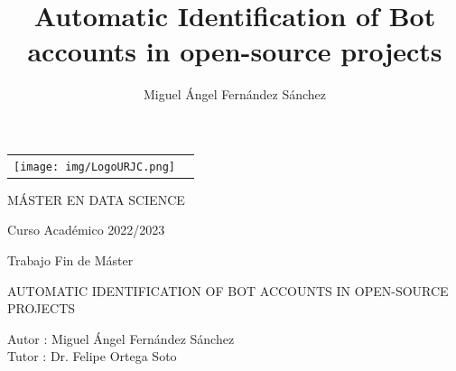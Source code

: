 \documentclass[a4paper, 12pt]{book}
\title{Automatic Identification of Bot accounts in open-source projects}
\author{Miguel Ángel Fernández Sánchez}
\begin{document}
 


\begin{titlepage}
\begin{center}
\begin{tabular}[c]{c c}
\texttt{[image: img/LogoURJC.png]}
\\
\end{tabular}

\vspace{3cm}

\Large 
MÁSTER EN DATA SCIENCE

\vspace{0.4cm}

\large
Curso Académico 2022/2023

\vspace{0.8cm}

Trabajo Fin de Máster

\vspace{2cm}

\LARGE AUTOMATIC IDENTIFICATION OF BOT ACCOUNTS IN OPEN-SOURCE PROJECTS
\vspace{3cm}

\large
Autor : Miguel Ángel Fernández Sánchez \\
Tutor : Dr. Felipe Ortega Soto
\end{center}
\end{titlepage}

\newpage
\mbox{}
\thispagestyle{empty} %


\clearpage
{}
\chapter*{}
\end{document}
